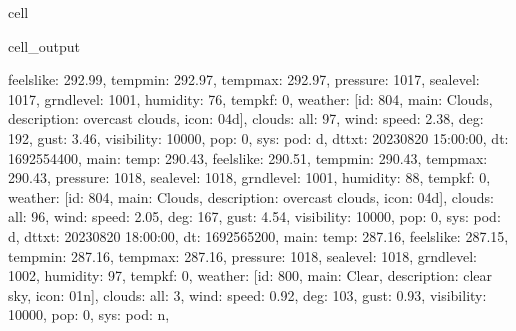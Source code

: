 \documentclass[letterpaper,10pt,english]{jupyterBook}
\begin{document}
\begin{sphinxuseclass}{cell}
\begin{sphinxVerbatimOutput}
\begin{sphinxuseclass}{cell_output}
\begin{sphinxVerbatim}[commandchars=\\\{\}]
\PYGZsq{}feels\PYGZus{}like\PYGZsq{}: 292.99, \PYGZsq{}temp\PYGZus{}min\PYGZsq{}: 292.97, \PYGZsq{}temp\PYGZus{}max\PYGZsq{}: 292.97, \PYGZsq{}pressure\PYGZsq{}: 1017, \PYGZsq{}sea\PYGZus{}level\PYGZsq{}: 1017, \PYGZsq{}grnd\PYGZus{}level\PYGZsq{}: 1001, \PYGZsq{}humidity\PYGZsq{}: 76, \PYGZsq{}temp\PYGZus{}kf\PYGZsq{}: 0\PYGZcb{}, \PYGZsq{}weather\PYGZsq{}: [\PYGZob{}\PYGZsq{}id\PYGZsq{}: 804, \PYGZsq{}main\PYGZsq{}: \PYGZsq{}Clouds\PYGZsq{}, \PYGZsq{}description\PYGZsq{}: \PYGZsq{}overcast clouds\PYGZsq{}, \PYGZsq{}icon\PYGZsq{}: \PYGZsq{}04d\PYGZsq{}\PYGZcb{}], \PYGZsq{}clouds\PYGZsq{}: \PYGZob{}\PYGZsq{}all\PYGZsq{}: 97\PYGZcb{}, \PYGZsq{}wind\PYGZsq{}: \PYGZob{}\PYGZsq{}speed\PYGZsq{}: 2.38, \PYGZsq{}deg\PYGZsq{}: 192, \PYGZsq{}gust\PYGZsq{}: 3.46\PYGZcb{}, \PYGZsq{}visibility\PYGZsq{}: 10000, \PYGZsq{}pop\PYGZsq{}: 0, \PYGZsq{}sys\PYGZsq{}: \PYGZob{}\PYGZsq{}pod\PYGZsq{}: \PYGZsq{}d\PYGZsq{}\PYGZcb{}, \PYGZsq{}dt\PYGZus{}txt\PYGZsq{}: \PYGZsq{}2023\PYGZhy{}08\PYGZhy{}20 15:00:00\PYGZsq{}\PYGZcb{}, \PYGZob{}\PYGZsq{}dt\PYGZsq{}: 1692554400, \PYGZsq{}main\PYGZsq{}: \PYGZob{}\PYGZsq{}temp\PYGZsq{}: 290.43, \PYGZsq{}feels\PYGZus{}like\PYGZsq{}: 290.51, \PYGZsq{}temp\PYGZus{}min\PYGZsq{}: 290.43, \PYGZsq{}temp\PYGZus{}max\PYGZsq{}: 290.43, \PYGZsq{}pressure\PYGZsq{}: 1018, \PYGZsq{}sea\PYGZus{}level\PYGZsq{}: 1018, \PYGZsq{}grnd\PYGZus{}level\PYGZsq{}: 1001, \PYGZsq{}humidity\PYGZsq{}: 88, \PYGZsq{}temp\PYGZus{}kf\PYGZsq{}: 0\PYGZcb{}, \PYGZsq{}weather\PYGZsq{}: [\PYGZob{}\PYGZsq{}id\PYGZsq{}: 804, \PYGZsq{}main\PYGZsq{}: \PYGZsq{}Clouds\PYGZsq{}, \PYGZsq{}description\PYGZsq{}: \PYGZsq{}overcast clouds\PYGZsq{}, \PYGZsq{}icon\PYGZsq{}: \PYGZsq{}04d\PYGZsq{}\PYGZcb{}], \PYGZsq{}clouds\PYGZsq{}: \PYGZob{}\PYGZsq{}all\PYGZsq{}: 96\PYGZcb{}, \PYGZsq{}wind\PYGZsq{}: \PYGZob{}\PYGZsq{}speed\PYGZsq{}: 2.05, \PYGZsq{}deg\PYGZsq{}: 167, \PYGZsq{}gust\PYGZsq{}: 4.54\PYGZcb{}, \PYGZsq{}visibility\PYGZsq{}: 10000, \PYGZsq{}pop\PYGZsq{}: 0, \PYGZsq{}sys\PYGZsq{}: \PYGZob{}\PYGZsq{}pod\PYGZsq{}: \PYGZsq{}d\PYGZsq{}\PYGZcb{}, \PYGZsq{}dt\PYGZus{}txt\PYGZsq{}: \PYGZsq{}2023\PYGZhy{}08\PYGZhy{}20 18:00:00\PYGZsq{}\PYGZcb{}, \PYGZob{}\PYGZsq{}dt\PYGZsq{}: 1692565200, \PYGZsq{}main\PYGZsq{}: \PYGZob{}\PYGZsq{}temp\PYGZsq{}: 287.16, \PYGZsq{}feels\PYGZus{}like\PYGZsq{}: 287.15, \PYGZsq{}temp\PYGZus{}min\PYGZsq{}: 287.16, \PYGZsq{}temp\PYGZus{}max\PYGZsq{}: 287.16, \PYGZsq{}pressure\PYGZsq{}: 1018, \PYGZsq{}sea\PYGZus{}level\PYGZsq{}: 1018, \PYGZsq{}grnd\PYGZus{}level\PYGZsq{}: 1002, \PYGZsq{}humidity\PYGZsq{}: 97, \PYGZsq{}temp\PYGZus{}kf\PYGZsq{}: 0\PYGZcb{}, \PYGZsq{}weather\PYGZsq{}: [\PYGZob{}\PYGZsq{}id\PYGZsq{}: 800, \PYGZsq{}main\PYGZsq{}: \PYGZsq{}Clear\PYGZsq{}, \PYGZsq{}description\PYGZsq{}: \PYGZsq{}clear sky\PYGZsq{}, \PYGZsq{}icon\PYGZsq{}: \PYGZsq{}01n\PYGZsq{}\PYGZcb{}], \PYGZsq{}clouds\PYGZsq{}: \PYGZob{}\PYGZsq{}all\PYGZsq{}: 3\PYGZcb{}, \PYGZsq{}wind\PYGZsq{}: \PYGZob{}\PYGZsq{}speed\PYGZsq{}: 0.92, \PYGZsq{}deg\PYGZsq{}: 103, \PYGZsq{}gust\PYGZsq{}: 0.93\PYGZcb{}, \PYGZsq{}visibility\PYGZsq{}: 10000, \PYGZsq{}pop\PYGZsq{}: 0, \PYGZsq{}sys\PYGZsq{}: \PYGZob{}\PYGZsq{}pod\PYGZsq{}: \PYGZsq{}n\PYGZsq{}\PYGZcb{}, 
\end{sphinxVerbatim}
\end{sphinxuseclass}
\end{sphinxVerbatimOutput}
\end{sphinxuseclass}
\end{document}

